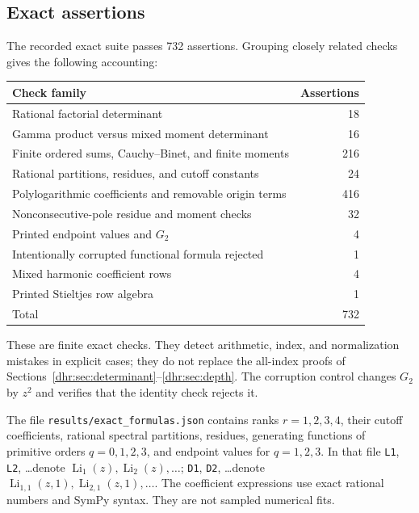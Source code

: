 \documentclass[11pt,letterpaper]{article}
\numberwithin{equation}{section}
\theoremstyle{definition}\newtheorem{definition}[theorem]{Definition}
\theoremstyle{remark}\newtheorem{remark}[theorem]{Remark}
\DeclareMathOperator{\Li}{Li}
\begin{document}
\subsection{Exact assertions}
The recorded exact suite passes 732 assertions. Grouping closely
related checks gives the following accounting:
\begin{center}
\small
\begin{tabular}{lr}
\toprule
Check family & Assertions\\
\midrule
Rational factorial determinant & 18\\
Gamma product versus mixed moment determinant & 16\\
Finite ordered sums, Cauchy--Binet, and finite moments & 216\\
Rational partitions, residues, and cutoff constants & 24\\
Polylogarithmic coefficients and removable origin terms & 416\\
Nonconsecutive-pole residue and moment checks & 32\\
Printed endpoint values and $G_2$ & 4\\
Intentionally corrupted functional formula rejected & 1\\
Mixed harmonic coefficient rows & 4\\
Printed Stieltjes row algebra & 1\\
\midrule
Total & 732\\
\bottomrule
\end{tabular}
\end{center}
These are finite exact checks. They detect arithmetic, index, and
normalization mistakes in explicit cases; they do not replace the
all-index proofs of Sections~\ref{dhr:sec:determinant}--\ref{dhr:sec:depth}.
The corruption control changes $G_2$ by $z^2$ and verifies that the
identity check rejects it.

The file \texttt{results/exact\_formulas.json} contains ranks
$r=1,2,3,4$, their cutoff coefficients, rational spectral partitions,
residues, generating functions of primitive orders $q=0,1,2,3$, and
endpoint values for $q=1,2,3$. In that file \texttt{L1}, \texttt{L2},
\ldots denote $\Li_1(z),\Li_2(z),\ldots$; \texttt{D1}, \texttt{D2},
\ldots denote $\Li_{1,1}(z,1),\Li_{2,1}(z,1),\ldots$.
The coefficient expressions use exact rational numbers and SymPy
syntax. They are not sampled numerical fits.
\end{document}
